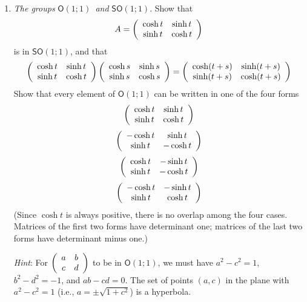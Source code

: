 \documentclass{amsbook}
\theoremstyle{plain}
\numberwithin{equation}{chapter}
\numberwithin{theorem}{chapter}
\begin{document}
\begin{enumerate}
\item \label{so11}\textit{The groups }$\mathsf{O}(1;1)$\textit{\ and
}$\mathsf{SO}(1;1)$. Show that
\[
A=\left(
\begin{array}
[c]{cc}%
\cosh t & \sinh t\\
\sinh t & \cosh t
\end{array}
\right)
\]
is in $\mathsf{SO}(1;1)$, and that
\[
\left(
\begin{array}
[c]{cc}%
\cosh t & \sinh t\\
\sinh t & \cosh t
\end{array}
\right)  \left(
\begin{array}
[c]{cc}%
\cosh s & \sinh s\\
\sinh s & \cosh s
\end{array}
\right)  =\left(
\begin{array}
[c]{cc}%
\cosh(t+s) & \sinh(t+s)\\
\sinh(t+s) & \cosh(t+s)
\end{array}
\right)
\]
Show that every element of $\mathsf{O}(1;1)$ can be written in one of the four
forms
\[
\left(
\begin{array}
[c]{cc}%
\cosh t & \sinh t\\
\sinh t & \cosh t
\end{array}
\right)
\]%
\[
\left(
\begin{array}
[c]{cc}%
-\cosh t & \sinh t\\
\sinh t & -\cosh t
\end{array}
\right)
\]%
\[
\left(
\begin{array}
[c]{cc}%
\cosh t & -\sinh t\\
\sinh t & -\cosh t
\end{array}
\right)
\]%
\[
\left(
\begin{array}
[c]{cc}%
-\cosh t & -\sinh t\\
\sinh t & \cosh t
\end{array}
\right)
\]
(Since $\cosh t$ is always positive, there is no overlap among the four cases.
Matrices of the first two forms have determinant one; matrices of the last two
forms have determinant minus one.)

\textit{Hint}: For $\left(
\begin{array}
[c]{cc}%
a & b\\
c & d
\end{array}
\right)  $ to be in $\mathsf{O}(1;1)$, we must have $a^{2}-c^{2}=1$,
$b^{2}-d^{2}=-1$, and $ab-cd=0$. The set of points $\left(  a,c\right)  $ in
the plane with $a^{2}-c^{2}=1$ (i.e., $a=\pm\sqrt{1+c^{2}}$\thinspace) is a hyperbola.


\end{enumerate}
\end{document}

